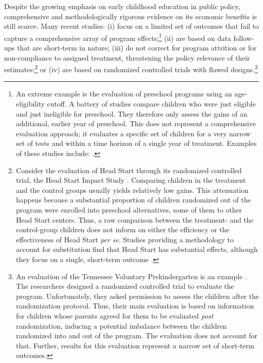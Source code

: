 \noindent Despite the growing emphasis on early childhood education in public policy, comprehensive and methodologically rigorous evidence on its economic benefits is still scarce. Many recent studies: (i) focus on a limited set of outcomes that fail to capture a comprehensive array of program effects;\footnote{An extreme example is the evaluation of preschool programs using an age-eligibility cutoff. A battery of studies compare children who were just eligible and just ineligible for preschool. They therefore only assess the gains of an additional, earlier year of preschool. This does not represent a comprehensive evaluation approach; it evaluates a specific set of children for a very narrow set of tests and within a time horizon of a single year of treatment. Examples of these studies include: \citet{Gormley_Gayer_2005_JHR,Gormley_Gayer_etal_2005_DP,Weiland_2013_CD_Impacts-of-Pre-K}.} (ii) are based on data follow-ups that are short-term in nature; (iii) do not correct for program attrition or for non-compliance to assigned treatment, threatening the policy relevance of their estimates;\footnote{Consider the evaluation of Head Start through its randomized controlled trial, the Head Start Impact Study \citep{Puma_Bell_etal_2010_HeadStartImpact}. Comparing children in the treatment and the control groups usually yields relatively low gains. This attenuation happens because a substantial proportion of children randomized out of the program were enrolled into preschool alternatives, some of them to other Head Start centers. Thus, a raw comparison between the treatment- and the control-group children does not inform on either the efficiency or the effectiveness of Head Start \emph{per se}. Studies providing a methodology to account for substitution find that Head Start has substantial effects, although they focus on a single, short-term outcome \citep{Kline-Walters_2015_NBER-Evaluating,Feller_Grindal_etal_2016_ComparedtoWhat}.} or (iv) are based on randomized controlled trials with flawed designs.\footnote{An evaluation of the Tennessee Voluntary Prekindergarten is an example \citep{Lipsey_et_al_2013_Tennessee_Kindergrtn_PRI,Lipsey_et_al_2015_Randomized_Control_Trial_PRI}. The researchers designed a randomized controlled trial to evaluate the program. Unfortunately, they asked permission to assess the children after the randomization protocol. Thus, their main evaluation is based on information for children whose parents agreed for them to be evaluated \textit{post} randomization, inducing a potential imbalance between the children randomized into and out of the program. The evaluation does not account for that. Further, results for this evaluation represent a narrow set of short-term outcomes.}\\ 

